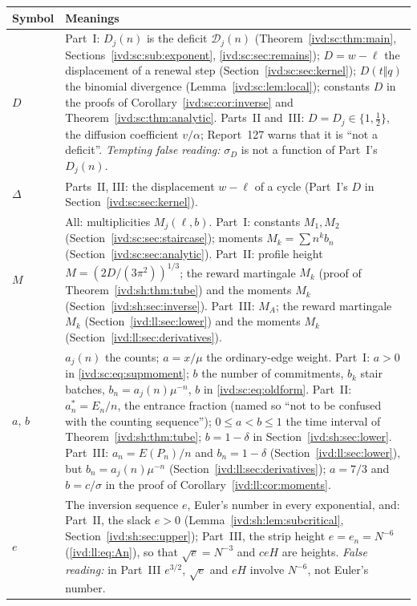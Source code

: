 \documentclass[11pt,letterpaper]{article}
\theoremstyle{remark}\newtheorem{remark}[theorem]{Remark}
\numberwithin{equation}{section}
\newcommand{\Dfc}{\mathcal D}
\begin{document}
\begin{longtable}{@{}>{\raggedright\arraybackslash}p{} >{\raggedright\arraybackslash}p{}@{}}
\toprule
Symbol & Meanings\\
\midrule
\endhead
$D$ & Part~I: $D_j(n)$ is the deficit $\Dfc_j(n)$ (Theorem~\ref{ivd:sc:thm:main}, Sections~\ref{ivd:sc:sub:exponent}, \ref{ivd:sc:sec:remains}); $D=w-\ell$ the displacement of a renewal step (Section~\ref{ivd:sc:sec:kernel}); $D(t\Vert q)$ the binomial divergence (Lemma~\ref{ivd:sc:lem:local}); constants $D$ in the proofs of Corollary~\ref{ivd:sc:cor:inverse} and Theorem~\ref{ivd:sc:thm:analytic}. Parts~II and~III: $D=D_j\in\{1,\frac12\}$, the diffusion coefficient $v/\alpha$; Report~127 warns that it is ``not a deficit''. \emph{Tempting false reading:} $\sigma_D$ is not a function of Part~I's $D_j(n)$.\\
$\Delta$ & Parts~II, III: the displacement $w-\ell$ of a cycle (Part~I's $D$ in Section~\ref{ivd:sc:sec:kernel}).\\
$M$ & All: multiplicities $M_j(\ell,b)$. Part~I: constants $M_1,M_2$ (Section~\ref{ivd:sc:sec:staircase}); moments $M_k=\sum n^kb_n$ (Section~\ref{ivd:sc:sec:analytic}). Part~II: profile height $M=(2D/(3\pi^2))^{1/3}$; the reward martingale $M_k$ (proof of Theorem~\ref{ivd:sh:thm:tube}) and the moments $M_k$ (Section~\ref{ivd:sh:sec:inverse}). Part~III: $M_A$; the reward martingale $M_k$ (Section~\ref{ivd:ll:sec:lower}) and the moments $M_k$ (Section~\ref{ivd:ll:sec:derivatives}).\\
$a$, $b$ & $a_j(n)$ the counts; $a=x/\mu$ the ordinary-edge weight. Part~I: $a>0$ in \eqref{ivd:sc:eq:supmoment}; $b$ the number of commitments, $b_k$ stair batches, $b_n=a_j(n)\mu^{-n}$, $b$ in \eqref{ivd:sc:eq:oldform}. Part~II: $a_n^*=E_n/n$, the entrance fraction (named so ``not to be confused with the counting sequence''); $0\le a<b\le1$ the time interval of Theorem~\ref{ivd:sh:thm:tube}; $b=1-\delta$ in Section~\ref{ivd:sh:sec:lower}. Part~III: $a_n=E(P_n)/n$ and $b_n=1-\delta$ (Section~\ref{ivd:ll:sec:lower}), but $b_n=a_j(n)\mu^{-n}$ (Section~\ref{ivd:ll:sec:derivatives}); $a=7/3$ and $b=c/\sigma$ in the proof of Corollary~\ref{ivd:ll:cor:moments}.\\
$e$ & The inversion sequence $e$, Euler's number in every exponential, and: Part~II, the slack $e>0$ (Lemma~\ref{ivd:sh:lem:subcritical}, Section~\ref{ivd:sh:sec:upper}); Part~III, the strip height $e=e_n=N^{-6}$ (\eqref{ivd:ll:eq:An}), so that $\sqrt e=N^{-3}$ and $ceH$ are heights. \emph{False reading:} in Part~III $e^{3/2}$, $\sqrt e$ and $eH$ involve $N^{-6}$, not Euler's number.\\

\end{longtable}
\end{document}
